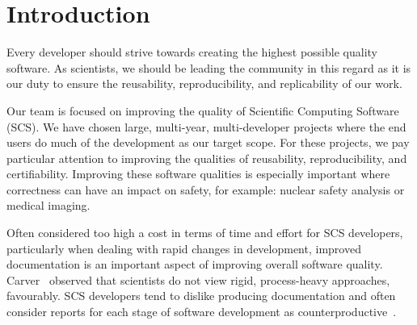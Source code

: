 \documentclass[sigconf]{acmart}
\begin{document}


\maketitle

\section{Introduction} \label{SecIntroduction}

Every developer should strive towards creating the highest possible quality software.
As scientists, we should be leading the community in this regard as it is our
duty to ensure the reusability, reproducibility, and replicability of our work.

Our team is focused on improving the quality of Scientific Computing Software (SCS).
We have chosen large, multi-year, multi-developer projects where the end users
do much of the development as our target scope. For these projects, we pay
particular attention to improving the qualities of reusability, reproducibility,
and certifiability. Improving these software qualities is especially important where
correctness can have an impact on safety, for example: nuclear safety analysis
or medical imaging.

Often considered too high a cost in terms of time and effort for SCS developers, 
particularly when dealing with rapid changes in development, improved 
documentation is an important aspect of improving overall software quality. 
Carver~\cite{CarverEtAl2007} observed that scientists do not view rigid, 
process-heavy approaches, favourably. SCS developers tend to dislike producing 
documentation and often consider reports for each stage of software development 
as counterproductive~\cite[p.~373]{Roache1998}.
\end{document}
